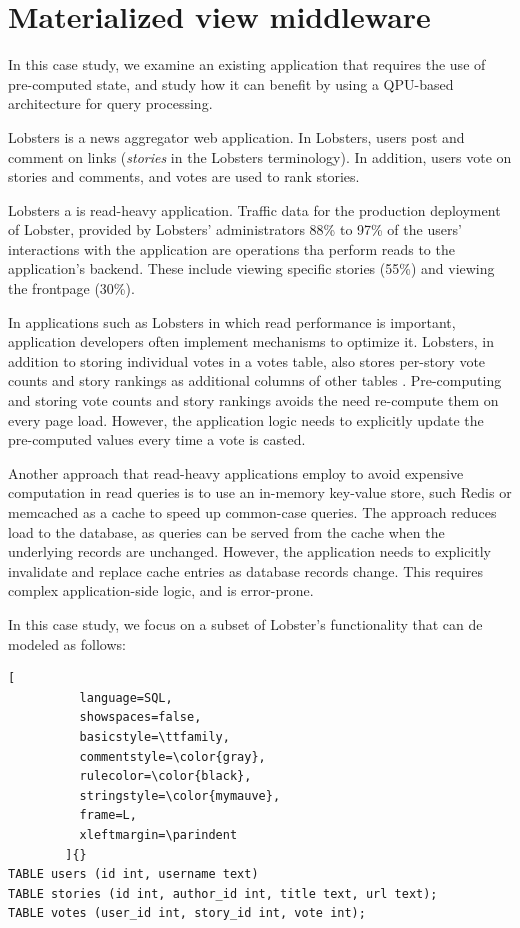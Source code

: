 \section{Materialized view middleware}
\label{sec:lobsters}

In this case study, we examine an existing application that requires the use of pre-computed state,
and study how it can benefit by using a QPU-based architecture for query processing.

Lobsters \cite{lobste:rs} is a news aggregator web application.
In Lobsters, users post and comment on links (\textit{stories} in the Lobsters terminology).
In addition, users vote on stories and comments, and votes are used to rank stories.

Lobsters a is read-heavy application.
Traffic data for the production deployment of Lobster, provided by Lobsters' administrators \cite{lobste:stats} 88\% to 97\%
of the users' interactions with the application are operations tha perform reads to the application's backend.
These include viewing specific stories (55\%) and viewing the frontpage (30\%).

In applications such as Lobsters in which read performance is important, application developers often implement mechanisms to optimize it.
Lobsters, in addition to storing individual votes in a votes table, also stores per-story vote counts and story rankings as additional columns of other tables \cite{lobsters:schema}.
Pre-computing and storing vote counts and story rankings avoids the need re-compute them on every page load.
However, the application logic needs to explicitly update the pre-computed values every time a vote is casted.

Another approach that read-heavy applications employ to avoid expensive computation in read queries
is to use an in-memory key-value store, such Redis or memcached \cite{nishtala:memcachefacebook}
as a cache to speed up common-case queries.
The approach reduces load to the database,
as queries can be served from the cache when the underlying records are unchanged.
However, the application needs to explicitly invalidate and replace cache entries as database records change.
This requires complex application-side logic, and is error-prone.

\bigskip
\noindent
In this case study, we focus on a subset of Lobster's functionality that can de modeled as follows:

\begin{lstlisting}[
          language=SQL,
          showspaces=false,
          basicstyle=\ttfamily,
          commentstyle=\color{gray},
          rulecolor=\color{black},
          stringstyle=\color{mymauve},
          frame=L,
          xleftmargin=\parindent
        ]{}
TABLE users (id int, username text)
TABLE stories (id int, author_id int, title text, url text);
TABLE votes (user_id int, story_id int, vote int);
\end{lstlisting}

